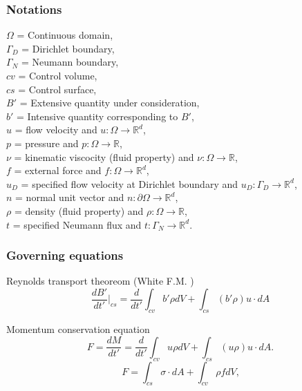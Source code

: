 \documentclass{beamer}
\begin{document}
\begin{frame}
\frametitle{Notations}
$\Omega$ = Continuous domain,\\
$\Gamma_D$ = Dirichlet boundary, \\
$\Gamma_N$ = Neumann boundary, \\
$cv$ = Control volume,\\
$cs$ = Control surface,\\
$B'$ = Extensive quantity under consideration,\\
$b'$ = Intensive quantity corresponding to $B'$,\\
$u$ = flow velocity and $u:\Omega \rightarrow \mathbb{R}^d$,\\
$p$ = pressure and $p:\Omega \rightarrow \mathbb{R}$,\\
$\nu$ = kinematic viscocity (fluid property) and $\nu:\Omega \rightarrow \mathbb{R}$,\\ 
$f$ = external force and $f:\Omega \rightarrow \mathbb{R}^d$,\\
$u_D$ = specified flow velocity at Dirichlet boundary and $u_D:\Gamma_D \rightarrow \mathbb{R}^d$,\\
$n$ = normal unit vector and $n:\partial \Omega \rightarrow \mathbb{R}^d$,\\
$\rho$ = density (fluid property) and $\rho:\Omega \rightarrow \mathbb{R}$,\\
$t$ = specified Neumann flux and $t:\Gamma_N \rightarrow \mathbb{R}^d$.\\
\end{frame}


\begin{frame}
\frametitle{Governing equations}

\begin{block}{Reynolds transport theoreom (White F.M. \cite{white})} 
\begin{equation} \label{rtt} 
\frac{dB'}{dt'}|_{cs} = \frac{d}{dt'} \int_{cv} b' \rho dV + \int_{cs} (b' \rho) u\cdot dA 
\end{equation}
\end{block}

\begin{block}{Momentum conservation equation}
\begin{equation}\label{External force lhs}
F = \frac{dM}{dt'} = \frac{d}{dt'} \int_{cv} u \rho dV + \int_{cs} (u \rho) u\cdot dA \textrm{.}
\end{equation}
\begin{equation}\label{External force rhs}
F = \int_{cs} \sigma \cdot dA + \int_{cv} \rho f dV \textrm{,}
\end{equation}
\end{block}

\end{frame}
\end{document}
